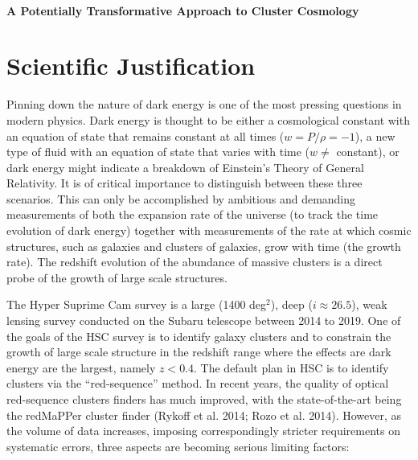 \documentclass[letterpaper,12pt]{article}
\begin{document}
\\[-1cm]
\begin{center}
\bf\Large
A Potentially Transformative Approach to Cluster Cosmology 
\end{center}

\section{Scientific Justification} 

Pinning down the nature of dark energy is one of the most pressing questions in modern physics. Dark energy is thought
to be either a cosmological constant with an equation of state that remains constant at all times ($w=P/\rho=-1$), a
new type of fluid with an equation of state that varies with time ($w \neq$ constant), or dark energy might indicate a
breakdown of Einstein's Theory of General Relativity. It is of critical importance to distinguish between these three
scenarios. This can only be accomplished by ambitious and demanding measurements of both the expansion rate of the
universe (to track the time evolution of dark energy) together with measurements of the rate at which cosmic
structures, such as galaxies and clusters of galaxies, grow with time (the growth rate). The redshift evolution of
the abundance of massive clusters is a direct probe of the growth of large scale structures.

The Hyper Suprime Cam survey is a large (1400 deg$^2$), deep ($i\approx26.5$), weak lensing survey conducted on the Subaru
telescope between 2014 to 2019. One of the goals of the HSC survey is to identify galaxy clusters and to constrain
the growth of large scale structure in the redshift range where the effects are dark energy are the largest, namely
$z<0.4$. The default plan in HSC is to identify clusters via the  ``red-sequence'' method. In recent years, the
quality of optical red-sequence clusters finders has much improved, with the state-of-the-art being the redMaPPer
cluster finder (Rykoff et al. 2014; Rozo et al. 2014). However, as the volume of data increases, imposing
correspondingly stricter requirements on systematic errors, three aspects are becoming serious limiting factors:
\end{document}
